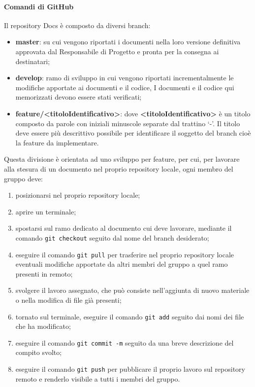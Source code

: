 			\paragraph{Comandi di GitHub}
				Il repository Docs è composto da diversi branch:
				\begin{itemize}
					\item\textbf{master}: su cui vengono riportati i documenti nella loro versione definitiva approvata dal Responsabile di Progetto e pronta per la consegna ai destinatari;
					\item\textbf{develop}: ramo di sviluppo in cui vengono riportati incrementalmente le modifiche apportate ai documenti e il codice, I documenti e il codice qui memorizzati devono essere stati verificati;
					\item\textbf{feature/<titoloIdentificativo>}: dove \textbf{<titoloIdentificativo>} è un titolo composto da parole con iniziali minuscole separate dal trattino ‘-’. Il titolo deve essere più descrittivo possibile per identificare il soggetto del branch cioè la feature da implementare.
				\end{itemize}
				Questa divisione è orientata ad uno sviluppo per feature, per cui, per lavorare alla stesura di un documento nel proprio repository locale, ogni membro del gruppo deve:
				\begin{enumerate}
					\item posizionarsi nel proprio repository locale;
					\item aprire un terminale;
					\item spostarsi sul ramo dedicato al documento cui deve lavorare, mediante il comando \texttt{git checkout} seguito dal nome del branch desiderato;
					\item eseguire il comando \texttt{git pull} per trasferire nel proprio repository locale eventuali modifiche apportate da altri membri del gruppo a quel ramo presenti in remoto;
					\item svolgere il lavoro assegnato, che può consiste nell'aggiunta di nuovo materiale o nella modifica di file già presenti;
					\item tornato sul terminale, eseguire il comando \texttt{git add} seguito dai nomi dei file che ha modificato;
					\item eseguire il comando \texttt{git commit -m} seguito da una breve descrizione del compito svolto;
					\item eseguire il comando \texttt{git push} per pubblicare il proprio lavoro sul repository remoto e renderlo visibile a tutti i membri del gruppo.
				\end{enumerate}
				
